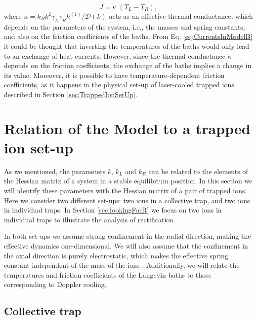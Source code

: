 %
%
\begin{equation}
  J = \kappa\;(T_L - T_R),
  \label{eq:CurrentsInModelB}
\end{equation}
%
where $\kappa = k_B {k^2\gamma_L \gamma_R h^{(1)}}/{\mathcal{D}(k)}$ acts as an effective thermal conductance, which depends on the parameters of the system, i.e., the masses and spring constants, and also on the friction coefficients of the baths. From Eq. \eqref{eq:CurrentsInModelB} it could be thought that inverting the temperatures of the baths would only lead to an exchange of heat currents. However, since the thermal conductance $\kappa$ depends on the friction coefficients, the exchange of the baths implies a change in its value. Moreover, it is possible to have temperature-dependent friction coefficients, as it happens in the physical set-up of laser-cooled trapped ions described in Section \ref{sec:TrappedIonSetUp}.
%
%


\section{Relation of the Model to a trapped ion set-up \label{sec:TrappedIonSetUp}}

As we mentioned, the parameters $k$, $k_L$ and $k_R$ can be related to the elements of the Hessian matrix of a system in a stable equilibrium position. In this section we will identify these parameters with the Hessian matrix of a pair of trapped ions. Here we consider two different set-ups: two ions in a collective trap, and two ions in individual traps. In Section \ref{sec:lookingForR} we focus on two ions in individual traps to illustrate the analysis of rectification.

In both set-ups we assume strong confinement in the radial direction, making the effective dynamics one-dimensional. We will also assume that the confinement in the axial direction is purely electrostatic, which makes the effective spring constant independent of the mass of the ions \cite{Leibfried2003}. Additionally, we will relate the temperatures and friction coefficients of the Langevin baths to those corresponding to Doppler cooling.

\subsection{Collective trap}

